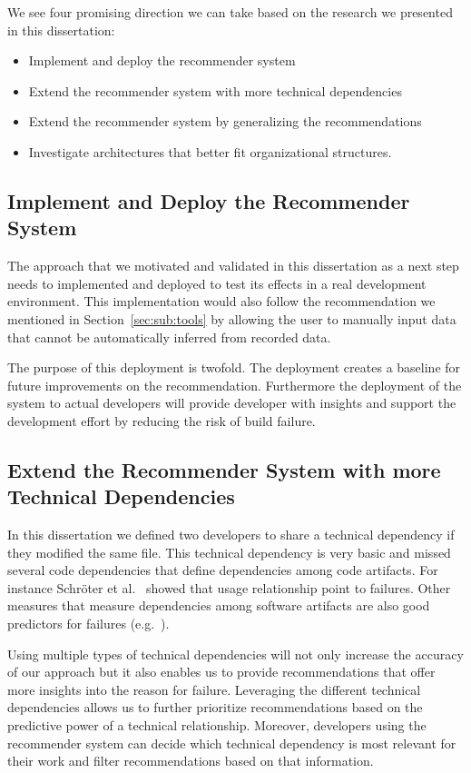 We see four promising direction we can take based on the research we presented in this dissertation:
\begin{itemize}
\item Implement and deploy the recommender system
\item Extend the recommender system with more technical dependencies
\item Extend the recommender system by generalizing the recommendations
\item Investigate architectures that better fit organizational structures.
\end{itemize}

\subsection{Implement and Deploy the Recommender System}
The approach that we motivated and validated in this dissertation as a next step needs to implemented and deployed to test its effects in a real development environment.
This implementation would also follow the recommendation we mentioned in Section~\ref{sec:sub:tools} by allowing the user to manually input data that cannot be automatically inferred from recorded data.

The purpose of this deployment is twofold.
The deployment creates a baseline for future improvements on the recommendation.
Furthermore the deployment of the system to actual developers will provide developer with insights and support the development effort by reducing the risk of build failure.



\subsection{Extend the Recommender System with more Technical Dependencies}
In this dissertation we defined two developers to share a technical dependency if they modified the same file.
This technical dependency is very basic and missed several code dependencies that define dependencies among code artifacts.
For instance Schr\"oter et al.~\cite{schroeter:isese:2006} showed that usage relationship point to failures.
Other measures that measure dependencies among software artifacts are also good predictors for failures (e.g.~\cite{nagappan:icse:2006}).

Using multiple types of technical dependencies will not only increase the accuracy of our approach but it also enables us to provide recommendations that offer more insights into the reason for failure.
Leveraging the different technical dependencies allows us to further prioritize recommendations based on the predictive power of a technical relationship.
Moreover, developers using the recommender system can decide which technical dependency is most relevant for their work and filter recommendations based on that information.

